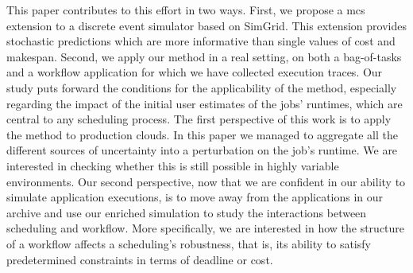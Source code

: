 \documentclass[10pt,conference,compsocconf]{IEEEtran}
\begin{document}
This paper contributes to this effort in two ways. First, we propose a
\acl{mcs} extension to a discrete event simulator based on SimGrid. This
extension provides stochastic predictions which are more informative than single
values of cost and makespan. Second, we apply our method in a real setting,
on both a bag-of-tasks and a workflow application for which we have collected
execution traces. Our study puts forward the conditions for the applicability of
the method, especially regarding the impact of the initial user estimates of the
jobs' runtimes, which are central to any scheduling process. The first
perspective of this work is to apply the method to production clouds. In this
paper we managed to aggregate all the different sources of uncertainty into a
perturbation on the job's runtime. We are interested in checking whether this is
still possible in highly variable environments. Our second perspective, now that
we are confident in our ability to simulate application executions, is to move
away from the applications in our archive and use our enriched simulation to
study the interactions between scheduling and workflow. More specifically, we
are interested in how the structure of a workflow affects a scheduling's
robustness, that is, its ability to satisfy predetermined constraints in terms of
deadline or cost.





\newpage
\end{document}
